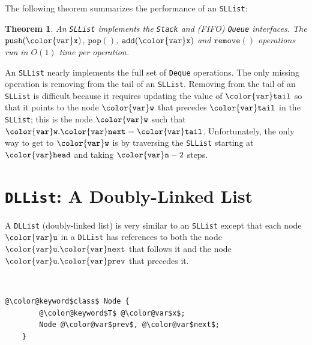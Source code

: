\documentclass[10pt]{book}
\newcommand{\seclabel}[1]{\label{sec:#1}}
\theoremstyle{plain}
\newtheorem{thm}{Theorem}[chapter]
\newcommand{\thmlabel}[1]{\label{thm:#1}}
\theoremstyle{definition}
\begin{document}
The following theorem summarizes the performance of an \texttt{SLList}:

\begin{thm}\thmlabel{sllist}
  An \texttt{SLList} implements the \texttt{Stack} and (FIFO) \texttt{Queue} interfaces.  
  The \ensuremath{\mathtt{push({\color{var}x})}}, \ensuremath{\mathtt{pop()}}, \ensuremath{\mathtt{add({\color{var}x})}} and \ensuremath{\mathtt{remove()}} operations run
  in $O(1)$ time per operation.
\end{thm}

An \texttt{SLList} nearly implements the full set of \texttt{Deque} operations.
The only missing operation is removing from the tail of an \texttt{SLList}.
Removing from the tail of an \texttt{SLList} is difficult because it requires
updating the value of \ensuremath{\mathtt{{\color{var}tail}}} so that it points to the node \ensuremath{\mathtt{{\color{var}w}}}
that precedes \ensuremath{\mathtt{{\color{var}tail}}} in the \texttt{SLList}; this is the node \ensuremath{\mathtt{{\color{var}w}}} such that
$\ensuremath{\mathtt{{\color{var}w}.{\color{var}next}}}=\ensuremath{\mathtt{{\color{var}tail}}}$.  Unfortunately, the only way to get to \ensuremath{\mathtt{{\color{var}w}}} is by
traversing the \texttt{SLList} starting at \ensuremath{\mathtt{{\color{var}head}}} and taking $\ensuremath{\mathtt{{\color{var}n}}}-2$ steps.

\section{\texttt{DLList}: A Doubly-Linked List}
\seclabel{dllist}

%
%
%
A \texttt{DLList} (doubly-linked list) is very similar to an \texttt{SLList} except
that each node \ensuremath{\mathtt{{\color{var}u}}} in a \texttt{DLList} has references to both the node \ensuremath{\mathtt{{\color{var}u}.{\color{var}next}}}
that follows it and the node \ensuremath{\mathtt{{\color{var}u}.{\color{var}prev}}} that precedes it.



 \ \vspace{.5ex}\begin{Verbatim}[gobble=1,tabsize=2,frame=single,framerule=1.2pt,commandchars=\\@\$,label=\texttt{DLList},labelposition=topline]
	@\color@keyword$class$ Node {
		@\color@keyword$T$ @\color@var$x$;
		Node @\color@var$prev$, @\color@var$next$;
	}
\end{Verbatim}
\end{document}

